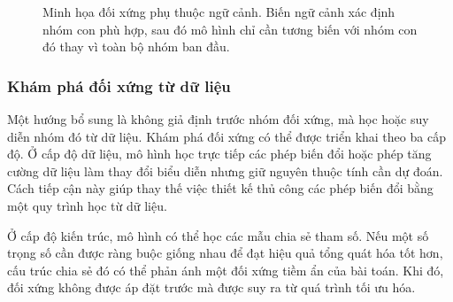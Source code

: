 \begin{figure}[H]
    \centering
    \caption{Minh họa đối xứng phụ thuộc ngữ cảnh. Biến ngữ cảnh xác định nhóm con phù hợp, sau đó mô hình chỉ cần tương biến với nhóm con đó thay vì toàn bộ nhóm ban đầu.}
    \label{fig:context-dependent-symmetry}
\end{figure}

\subsubsection{Khám phá đối xứng từ dữ liệu}

Một hướng bổ sung là không giả định trước nhóm đối xứng, mà học hoặc suy diễn nhóm đó từ dữ liệu. Khám phá đối xứng có thể được triển khai theo ba cấp độ. Ở cấp độ dữ liệu, mô hình học trực tiếp các phép biến đổi hoặc phép tăng cường dữ liệu làm thay đổi biểu diễn nhưng giữ nguyên thuộc tính cần dự đoán. Cách tiếp cận này giúp thay thế việc thiết kế thủ công các phép biến đổi bằng một quy trình học từ dữ liệu.

Ở cấp độ kiến trúc, mô hình có thể học các mẫu chia sẻ tham số. Nếu một số trọng số cần được ràng buộc giống nhau để đạt hiệu quả tổng quát hóa tốt hơn, cấu trúc chia sẻ đó có thể phản ánh một đối xứng tiềm ẩn của bài toán. Khi đó, đối xứng không được áp đặt trước mà được suy ra từ quá trình tối ưu hóa.

